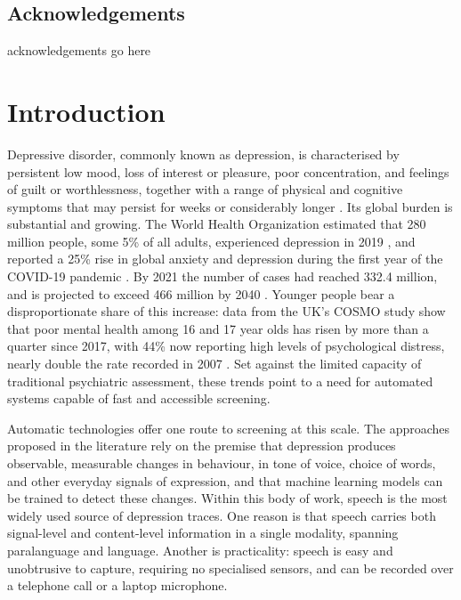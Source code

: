 \documentclass{mproj}
\begin{document}
\newpage
\section*{Acknowledgements}

acknowledgements go here

\tableofcontents

\chapter{Introduction}\label{intro}

Depressive disorder, commonly known as depression, is characterised by persistent low mood, loss of interest or pleasure, poor concentration, and feelings of guilt or worthlessness, together with a range of physical and cognitive symptoms that may persist for weeks or considerably longer \cite{who2026depression}. Its global burden is substantial and growing. The World Health Organization estimated that 280 million people, some 5\% of all adults, experienced depression in 2019 \cite{who2026depression}, and reported a 25\% rise in global anxiety and depression during the first year of the COVID-19 pandemic \cite{who2022covid}. By 2021 the number of cases had reached 332.4 million, and is projected to exceed 466 million by 2040 \cite{zhang2025burden}. Younger people bear a disproportionate share of this increase: data from the UK's COSMO study show that poor mental health among 16 and 17 year olds has risen by more than a quarter since 2017, with 44\% now reporting high levels of psychological distress, nearly double the rate recorded in 2007 \cite{cosmo2025}. Set against the limited capacity of traditional psychiatric assessment, these trends point to a need for automated systems capable of fast and accessible screening.

Automatic technologies offer one route to screening at this scale. The approaches proposed in the literature rely on the premise that depression produces observable, measurable changes in behaviour, in tone of voice, choice of words, and other everyday signals of expression, and that machine learning models can be trained to detect these changes. Within this body of work, speech is the most widely used source of depression traces. One reason is that speech carries both signal-level and content-level information in a single modality, spanning paralanguage and language. Another is practicality: speech is easy and unobtrusive to capture, requiring no specialised sensors, and can be recorded over a telephone call or a laptop microphone.
\end{document}
